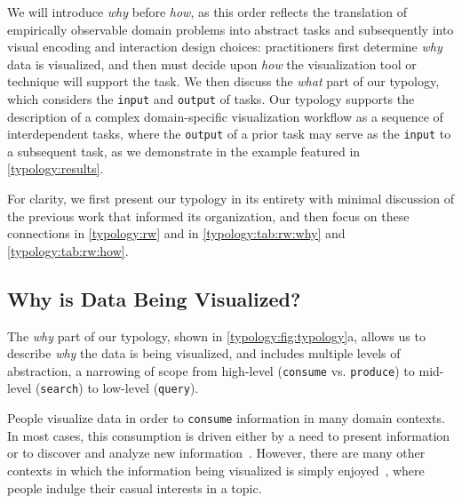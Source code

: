 We will introduce {\it why} before {\it how}, as this order reflects the translation of empirically observable domain problems into abstract tasks and subsequently into visual encoding and interaction design choices: practitioners first determine {\it why} data is visualized, and then must decide upon {\it how} the visualization tool or technique will support the task.
We then discuss the {\it what} part of our typology, which considers the {\tt input} and {\tt output} of tasks.
Our typology supports the description of a complex domain-specific visualization workflow as a sequence of interdependent tasks, where the {\tt output} of a prior task may serve as the {\tt input} to a subsequent task, as we demonstrate in the example featured in \autoref{typology:results}.

For clarity, we first present our typology in its entirety with minimal discussion of the previous work that informed its organization, and then focus on these connections in \autoref{typology:rw} and in \autoref{typology:tab:rw:why} and \autoref{typology:tab:rw:how}.


\subsection{Why is Data Being Visualized?}
\label{typology:why}


The {\it why} part of our typology, shown in \autoref{typology:fig:typology}a, allows us to describe {\it why} the data is being visualized, and includes multiple levels of abstraction, a narrowing of scope from high-level ({\tt consume} vs. {\tt produce}) to mid-level ({\tt search}) to low-level ({\tt query}).

People visualize data in order to {\tt consume} information in many domain contexts.
In most cases, this consumption is driven either by a need to present information or to discover and analyze new information~\cite{vanWijk2006}.
However, there are many other contexts in which the information being visualized is simply enjoyed~\cite{Dork2012,Pousman2007,Sprague2012}, where people indulge their casual interests in a topic.


